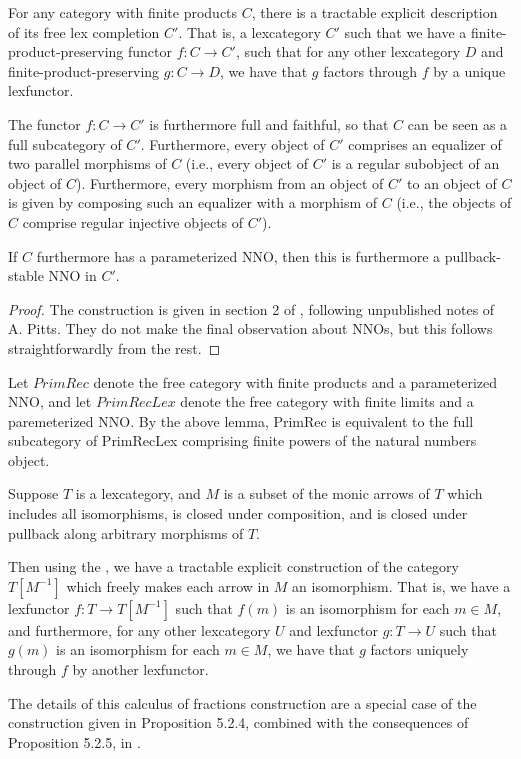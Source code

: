 \begin{lemma}
For any category with finite products $C$, there is a tractable explicit description of its free lex completion $C'$. That is, a lexcategory $C'$ such that we have a finite-product-preserving functor $f : C \to C'$, such that for any other lexcategory $D$ and finite-product-preserving $g: C \to D$, we have that $g$ factors through $f$ by a unique lexfunctor.

The functor $f: C \to C'$ is furthermore full and faithful, so that $C$ can be seen as a full subcategory of $C'$. Furthermore, every object of $C'$ comprises an equalizer of two parallel morphisms of $C$ (i.e., every object of $C'$ is a regular subobject of an object of $C$). Furthermore, every morphism from an object of $C'$ to an object of $C$ is given by composing such an equalizer with a morphism of $C$ (i.e., the objects of $C$ comprise regular injective objects of $C'$).

If $C$ furthermore has a parameterized NNO, then this is furthermore a pullback-stable NNO in $C'$.
\end{lemma}
\begin{proof}
The construction is given in section 2 of \autocite{BungeSymmetricTopos}, following unpublished notes of A. Pitts. They do not make the final observation about NNOs, but this follows straightforwardly from the rest.
\end{proof}

Let $PrimRec$ denote the free category with finite products and a parameterized NNO, and let $PrimRecLex$ denote the free category with finite limits and a paremeterized NNO. By the above lemma, PrimRec is equivalent to the full subcategory of PrimRecLex comprising finite powers of the natural numbers object.

\begin{construction}
Suppose $T$ is a lexcategory, and $M$ is a subset of the monic arrows of $T$ which includes all isomorphisms, is closed under composition, and is closed under pullback along arbitrary morphisms of $T$.

Then using the , we have a tractable explicit construction of the category $T[M^{-1}]$ which freely makes each arrow in $M$ an isomorphism. That is, we have a lexfunctor $f : T \to T[M^{-1}]$ such that $f(m)$ is an isomorphism for each $m \in M$, and furthermore, for any other lexcategory $U$ and lexfunctor $g : T \to U$ such that $g(m)$ is an isomorphism for each $m \in M$, we have that $g$ factors uniquely through $f$ by another lexfunctor.

The details of this calculus of fractions construction are a special case of the construction given in Proposition 5.2.4, combined with the consequences of Proposition 5.2.5, in \autocite{BorceuxHandbook1}.
\end{construction}


